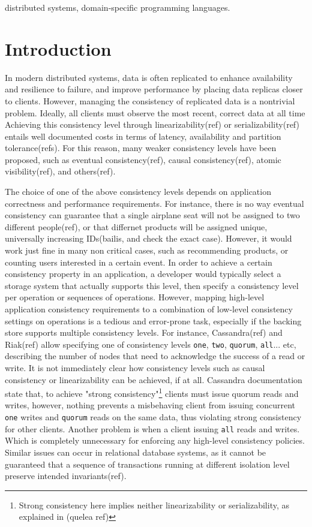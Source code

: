 \documentclass[preprint, numbers]{sigplanconf}
\begin{document}


\keywords
distributed systems, domain-specific programming languages.

\section{Introduction}
In modern distributed systems, data is often replicated 
to enhance availability and resilience to failure, and improve performance by
placing data replicas closer to clients. However, managing the consistency of 
replicated data is a nontrivial problem. Ideally, all clients must observe the most recent, correct data at all time 
Achieving this consistency level through linearizability(ref) or
serializability(ref) entails well
documented costs in terms of latency, availability and partition
tolerance(refs). For this reason, many weaker consistency levels have been proposed,
such as eventual consistency(ref), causal consistency(ref), atomic
visibility(ref), and others(ref). 

The choice of one of the above consistency levels depends on application
correctness and performance requirements. For instance, there is no way eventual consistency
can guarantee that a single airplane seat will not be assigned to two different
people(ref), or that differnet products will be assigned unique, universally
increasing IDs(bailis, and check the exact case). However, it would work just fine
in many non critical cases, such as recommending products, or counting users
interested in a certain event. In order to achieve a certain consistency
property in an application, a developer would typically select a storage system that
actually supports this level, then specify a consistency level per operation or
sequences of operations. However, mapping high-level application consistency requirements to  a combination of
low-level consistency settings on operations is a tedious and error-prone task, especially if
the backing store supports multiple consistency levels. For instance,
Cassandra(ref) and Riak(ref) allow specifying one of consistency levels
\texttt{one}, \texttt{two}, \texttt{quorum}, \texttt{all}... etc, describing the number of nodes that need to
acknowledge the success of a read or write. It
is not immediately clear how consistency levels such as causal consistency or
linearizability can be achieved, if at all.  Cassandra documentation state that,
to achieve "strong consistency"\footnote{ Strong consistency here implies
neither linearizability or serializability, as explained in (quelea ref)} clients must issue quorum reads and writes,
however, nothing prevents a misbehaving client from issuing concurrent \texttt{one} writes and
\texttt{quorum} reads on the same data, thus violating strong consistency for other clients. Another
problem is when a client issuing \texttt{all} reads and writes. Which is completely
unnecessary for enforcing any high-level consistency policies. Similar issues
can occur in relational database systems, as it cannot be guaranteed that a
sequence of transactions running at different isolation level preserve intended invariants(ref). 
\end{document}
